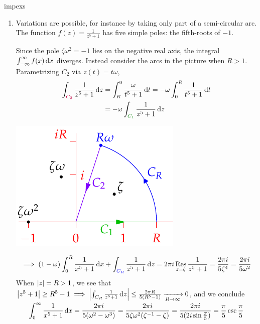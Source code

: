 \begin{examples}{}{impexs}
\begin{enumerate}
	
	  \item\label{ex:smallarc} Variations are possible, for instance by taking only part of a semi-circular arc. The function $f(z)=\frac 1{z^5+1}$ has five simple poles: the fifth-roots of $-1$.\par
	 	\begin{minipage}[t]{0.65\linewidth}\vspace{-10pt}
			Since the pole $\zeta\omega^2=-1$ lies on the negative real axis, the integral $\int_{-\infty}^\infty f(x)\,{\mathrm{d} x}$ diverges. Instead consider the arcs in the picture when $R>1$. Parametrizing $C_2$ via $z(t)=t\omega$,
			\begin{align*}
				\int_{\textcolor{purple}{C_2}}\frac 1{z^5+1}\,\dz
				&=\int_R^0\frac{\omega}{t^5+1}\,\dt
					=-\omega\int_0^R\frac{1}{t^5+1}\,\dt\\
				&=-\omega\int_{\textcolor{Green}{C_1}}\frac 1{z^5+1}\,\dz
			\end{align*}
		\end{minipage}
		\hfill
		\begin{minipage}[t]{0.34\linewidth}\vspace{-25pt}
			\flushright\includegraphics[scale=0.95]{integral4}
		\end{minipage}\par\vspace{-5pt}
		\[
			\implies(1-\omega)\int_0^R\frac 1{x^5+1}\,{\mathrm{d} x}
			+\int_{\textcolor{blue}{C_R}}\frac 1{z^5+1}\,{\mathrm{d} z}
			=2\pi i\operatorname*{Res}_{z=\zeta}\frac 1{z^5+1} 
			=\frac{2\pi i}{5\zeta^4}
			=\frac{2\pi i}{5\omega^2}
		\]
		When $\left| z\right|=R>1$, we see that $\smash[b]{\left| z^5+1\right|\ge R^5-1\implies\left| \int_{C_R}\frac 1{z^5+1}\,{\mathrm{d} z}\right|\le\frac{2\pi R}{5(R^5-1)}\xrightarrow[R\to\infty]{}0}$, and we conclude
		\[
			\int_0^\infty\frac 1{x^5+1}\,{\mathrm{d} x}
			=\frac{2\pi i}{5(\omega^2-\omega^3)} 
			=\frac{2\pi i}{5\zeta\omega^2(\zeta^{-1}-\zeta)} 
			=\frac{2\pi i}{5(2i\sin\frac\pi 5)}
			=\frac \pi 5\csc\frac\pi 5
		\]
	\end{enumerate}
\end{examples}


